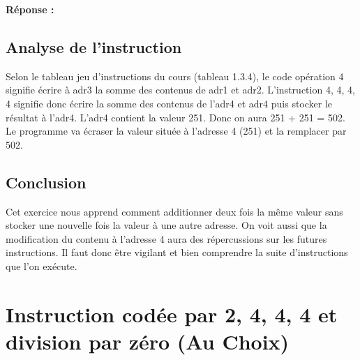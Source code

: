 \begin{graybox}
    \textbf{Réponse :}

    \subsection{Analyse de l'instruction}

    Selon le tableau jeu d'instructions du cours (tableau 1.3.4), le code opération 4 signifie 
    écrire à adr3 la somme des contenus de adr1 et adr2. 
    L’instruction 4, 4, 4, 4 signifie donc écrire la somme des contenus de l’adr4 et adr4
    puis stocker le résultat à l’adr4. L’adr4 contient la valeur 251. 
    Donc on aura 251 + 251 = 502. Le programme va écraser la valeur située 
    à l’adresse 4 (251) et la remplacer par 502. 
    

    \subsection{Conclusion}

    Cet exercice nous apprend comment additionner deux fois la même valeur sans 
    stocker une nouvelle fois la valeur à une autre adresse. On voit aussi
    que la modification du contenu à l'adresse 4 aura des répercussions sur les 
    futures instructions. Il faut donc être vigilant et bien comprendre la suite
    d'instructions que l'on exécute. 

\end{graybox}

\newpage


\setcounter{section}{3}
\section{Instruction codée par 2, 4, 4, 4 et division par zéro (Au Choix)}


